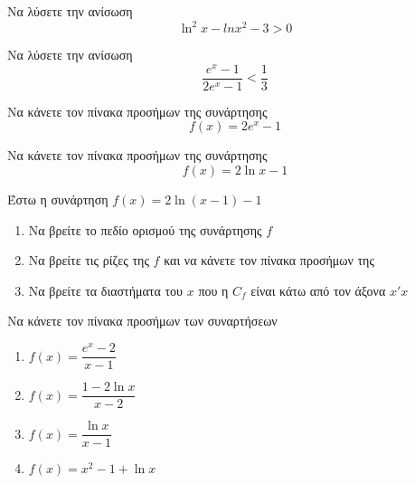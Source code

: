 \documentclass{presentation}
\begin{document}
\begin{askisi}
  Να λύσετε την ανίσωση
  $$\ln^2x-ln x^2-3>0$$


\end{askisi}

\begin{askisi}
  Να λύσετε την ανίσωση $$\dfrac{e^x-1}{2e^x-1}<\dfrac{1}{3}$$


\end{askisi}

\begin{askisi}
  Να κάνετε τον πίνακα προσήμων της συνάρτησης $$f(x)=2e^x-1$$


\end{askisi}

\begin{askisi}
  Να κάνετε τον πίνακα προσήμων της συνάρτησης $$f(x)=2\ln x-1$$


\end{askisi}

\begin{askisi}
  Έστω η συνάρτηση $f(x)=2\ln (x-1)-1$
  \begin{enumerate}
    \item<1-> Να βρείτε το πεδίο ορισμού της συνάρτησης $f$
    \item<2-> Να βρείτε τις ρίζες της $f$ και να κάνετε τον πίνακα προσήμων της
    \item<3-> Να βρείτε τα διαστήματα του $x$ που η $C_f$ είναι κάτω από τον άξονα $x'x$
  \end{enumerate}


\end{askisi}

\begin{askisi}
  Να κάνετε τον πίνακα προσήμων των συναρτήσεων
  \begin{enumerate}
    \item<1-> $f(x)=\dfrac{e^x-2}{x-1}$
    \item<2-> $f(x)=\dfrac{1-2\ln x}{x-2}$
    \item<3-> $f(x)=\dfrac{\ln x}{x-1}$
    \item<4-> $f(x)=x^2-1+\ln x$
  \end{enumerate}


\end{askisi}
\end{document}
